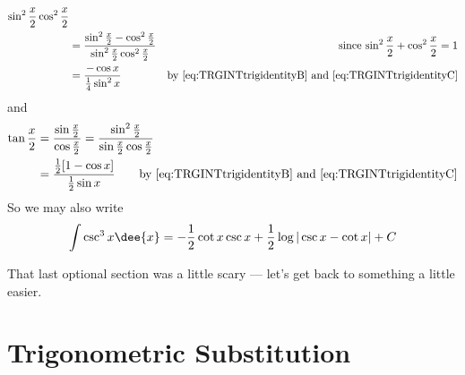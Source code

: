 \begin{eg}[$\int \csc^3 x\dee{x}$ -- by the $u=\tan\frac{x}{2}$
substitution]
\begin{itemize}
\begin{align*}
    {\sin^2\frac{x}{2}\cos^2\frac{x}{2}}\\
&=\frac{\sin^2\frac{x}{2}-\cos^2\frac{x}{2}}
    {\sin^2\frac{x}{2}\cos^2\frac{x}{2}}
&\text{since $\sin^2\frac{x}{2}+\cos^2\frac{x}{2}=1$}\\
&=\frac{-\cos x}{\frac{1}{4}\sin^2x}
&\text{by \eqref{eq:TRGINTtrigidentityB} and
  \eqref{eq:TRGINTtrigidentityC}}
\end{align*}
and
\begin{align*}
\tan\frac{x}{2}
&=\frac{\sin\frac{x}{2}}{\cos\frac{x}{2}}
=\frac{\sin^2\frac{x}{2}} {\sin\frac{x}{2}\cos\frac{x}{2}}\\
&=\frac{\frac{1}{2}[1-\cos x]}{\frac{1}{2}\sin x}
\qquad\text{by \eqref{eq:TRGINTtrigidentityB} and
  \eqref{eq:TRGINTtrigidentityC}}
\end{align*}
So we may also write
\begin{align*}
\int \csc^3 x\dee{x}
=-\frac{1}{2}\cot x\csc x
+\frac{1}{2}\log|\csc x-\cot x|+C
\end{align*}
\end{itemize}

\end{eg}
That last optional section was a little scary --- let's get back to something a little
easier.

\section{Trigonometric Substitution}\label{sec trigsub}



